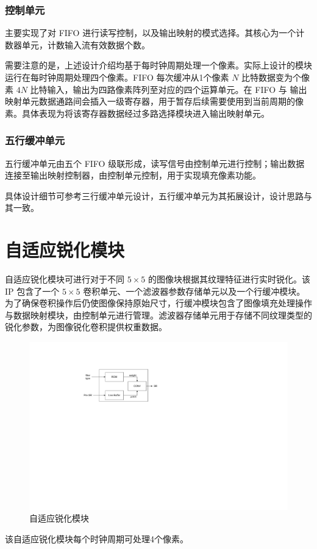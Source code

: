 \documentclass[12pt, a4paper, oneside]{ctexbook}
\begin{document}
	\subsubsection{控制单元}
	主要实现了对 FIFO 进行读写控制，以及输出映射的模式选择。其核心为一个计数器单元，计数输入流有效数据个数。\par 需要注意的是，上述设计介绍均基于每时钟周期处理一个像素。实际上设计的模块运行在每时钟周期处理四个像素。FIFO 每次缓冲从1个像素 $N$ 比特数据变为个像素 $4N$ 比特输入，输出为四路像素阵列至对应的四个运算单元。在 FIFO 与 输出映射单元数据通路间会插入一级寄存器，用于暂存后续需要使用到当前周期的像素。具体表现为将该寄存器数据经过多路选择模块进入输出映射单元。
	\subsubsection{五行缓冲单元}
	五行缓冲单元由五个 FIFO 级联形成，读写信号由控制单元进行控制；输出数据连接至输出映射控制器，由控制单元控制，用于实现填充像素功能。\par 具体设计细节可参考三行缓冲单元设计，五行缓冲单元为其拓展设计，设计思路与其一致。
	
	\section{自适应锐化模块}
	自适应锐化模块可进行对于不同 $5\times5$ 的图像块根据其纹理特征进行实时锐化。该 IP 包含了一个 $5\times5$ 卷积单元、一个滤波器参数存储单元以及一个行缓冲模块。为了确保卷积操作后仍使图像保持原始尺寸，行缓冲模块包含了图像填充处理操作与数据映射模块，由控制单元进行管理。滤波器存储单元用于存储不同纹理类型的锐化参数，为图像锐化卷积提供权重数据。
		\begin{figure}[h]
		\centering
		\includegraphics[scale=1]{pic/adapt.pdf}
		\caption{自适应锐化模块}
		\end{figure}	
	\par 该自适应锐化模块每个时钟周期可处理4个像素。
\end{document}
